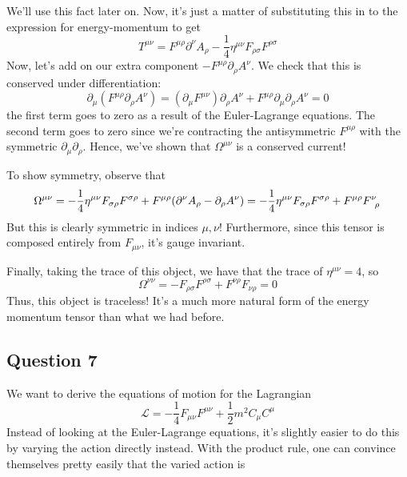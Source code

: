 \documentclass[11pt, oneside]{article}   	%
\theoremstyle{newline}
\theoremstyle{newline}
\theoremstyle{newline}
\theoremstyle{newline}
\theoremstyle{newline}
\begin{document}
We'll use this fact later on. Now, it's just a matter of substituting this in to the expression for energy-momentum to get
\[ 
T^{ \mu\nu } = F^{ \mu \rho } \partial^\nu A_\rho - \frac{1}{4} \eta^{ \mu \nu} F_{ \rho \sigma} F^{ \rho \sigma} 
\] 
Now, let's add on our extra component $ - F^{ \mu \rho } \partial_\rho A^\nu$. We check that this is conserved under differentiation: 
\[ 
\partial_\mu (F^{\mu \rho} \partial_\rho A^\nu ) = (\partial_\mu F^{ \mu \nu}) \partial_\rho A^\nu  + F^{ \mu \rho} \partial_\mu \partial_\rho A^\nu  = 0 \] 
the first term goes to zero as a result of the Euler-Lagrange equations. The second term goes to zero since we're contracting the antisymmetric $F^{ \mu \rho} $ with the symmetric $\partial_\mu \partial_\rho$.  
Hence, we've shown that $\Omega^{ \mu \nu} $ is a conserved current! 

To show symmetry, observe that 
\[ 
\Omega^{ \mu \nu} = -  \frac{1}{4} \eta^{ \mu \nu} F_{ \sigma\rho} F^{ \sigma \rho} + F^{ \mu \rho} ( \partial^\nu A_ \rho - \partial_\rho A^\nu) = 
- \frac{1}{4} \eta^{ \mu \nu} F_{ \sigma\rho} F^{ \sigma \rho} + F^{ \mu \rho}F\indices{^\nu_\rho} \] 
But this is clearly symmetric in indices $\mu, \nu$! Furthermore, since this tensor is composed entirely from $F_{\mu \nu}$, it's gauge invariant. 

Finally, taking the trace of this object, we have that the trace of $\eta^{\mu \nu} = 4 $, so 
\[ 
\Omega^{ \nu \nu} =  - F_{\rho\sigma} F^{ \rho\sigma} + F^{ \nu \rho} F_{\nu \rho} = 0
\] 
Thus, this object is traceless! It's a much more natural form of the energy momentum tensor than what we had before. 

\pagebreak 
\subsection{Question 7} 
We want to derive the equations of motion for the Lagrangian \[ 
\mathcal{L} =  - \frac{1}{4} F_{ \mu \nu}F^{ \mu\nu} + \frac{1}{2} m^2 C_\mu C^\mu 
\] 
Instead of looking at the Euler-Lagrange equations, it's slightly easier to do this by varying the action directly instead. With the product rule, one can convince themselves pretty easily that the varied action is 
\end{document}
